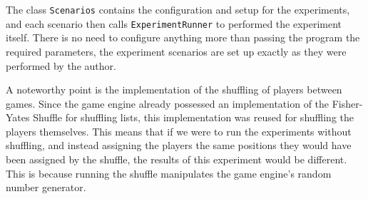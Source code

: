 The class \texttt{Scenarios} contains the configuration and setup for the experiments,
and each scenario then calls \texttt{ExperimentRunner} to performed
the experiment itself. There is no need to configure anything more than
passing the program the required parameters, the experiment scenarios
are set up exactly as they were performed by the author.

A noteworthy point is the implementation of the shuffling of players between games.
Since the game engine already possessed an implementation of the Fisher-Yates Shuffle
\cite{Knuth98} for shuffling lists, this implementation was reused for shuffling the
players themselves. This means that if we were to run the experiments
without shuffling, and instead assigning the players the same positions they would
have been assigned by the shuffle, the results of this experiment would be different.
This is because running the shuffle manipulates the game engine's random number generator.
